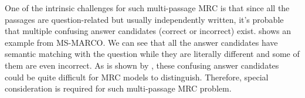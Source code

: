 




One of the intrinsic challenges for such multi-passage MRC is that since all the passages are question-related but usually independently written, it's probable that multiple confusing answer candidates (correct or incorrect) exist.  shows an example from MS-MARCO. We can see that all the answer candidates have semantic matching with the question while they are literally different and some of them are even incorrect. As is shown by , these confusing answer candidates could be quite difficult for MRC models to distinguish. Therefore, special consideration is required for such multi-passage MRC problem.

